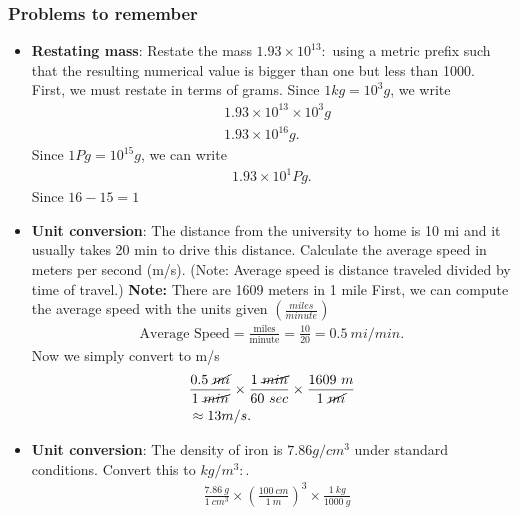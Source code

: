 \documentclass{report}
\begin{document}
    \subsubsection{Problems to remember}
    \begin{itemize}
        \item \textbf{Restating mass}: Restate the mass  $1.93 \times 10^{13}:$ using a metric prefix such that the resulting numerical value is bigger than one but less than 1000.
            \bigbreak \noindent 
            First, we must restate in terms of grams. Since $1kg = 10^{3}g$, we write
            \begin{align*}
                &1.93 \times 10^{13} \times 10^{3}g \\
                &1.93 \times 10^{16}g
            .\end{align*}
            Since $1Pg = 10^{15}g$, we can write
            \begin{align*}
               1.93 \times 10^{1}Pg 
            .\end{align*}
            Since $16-15 = 1 $
        \item \textbf{Unit conversion}: The distance from the university to home is 10 mi and it usually takes 20 min to drive this distance. Calculate the average speed in meters per second (m/s). (Note: Average speed is distance traveled divided by time of travel.)
        \bigbreak \noindent 
        \textbf{Note:} There are 1609 meters in 1 mile
        \bigbreak \noindent 
        First, we can compute the average speed with the units given $\left(\frac{miles}{minute}\right)$
        \begin{align*}
            \text{Average Speed} = \frac{\text{miles}}{\text{minute}} = \frac{10}{20} = 0.5\ mi/min
        .\end{align*}
        \bigbreak \noindent 
        Now we simply convert to m/s
        \begin{align*}
            &\frac{0.5\ \cancel{mi}}{1\ \cancel{min}} \times \frac{1\ \cancel{min}}{60\ sec} \times \frac{1609\ m}{1\ \cancel{mi}} \\
            &\approx 13 m/s
        .\end{align*}
    \item \textbf{Unit conversion}: The density of iron is  $7.86 g/cm^{3}$ under standard conditions. Convert this to $kg/m^{3}:$.
        \begin{align*}
            &\frac{7.86\ g}{1\ cm^{3}} \times \left(\frac{100\ cm}{1\ m}\right)^{3} \times \frac{1\ kg}{1000\ g} \\

\end{align*}
\end{itemize}
\end{document}
